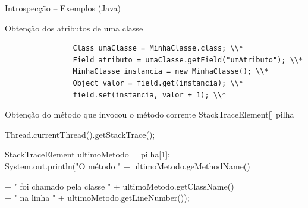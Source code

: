 \documentclass[12pt,t]{beamer}
\begin{document}
 	 \begin{frame}{Introspecção -- Exemplos (Java)}
 	 	\begin{exampleblock}{Obtenção dos atributos de uma classe}
 	 		\begin{lstlisting}
	 	 		Class umaClasse = MinhaClasse.class; \\*
				Field atributo = umaClasse.getField("umAtributo"); \\*
				MinhaClasse instancia = new MinhaClasse(); \\*
				Object valor = field.get(instancia); \\*
				field.set(instancia, valor + 1); \\*
			\end{lstlisting}
 	 	\end{exampleblock}
 	 	\begin{exampleblock}{Obtenção do método que invocou o método corrente}
 	 		StackTraceElement[] pilha = \\
 	 		\begin{adjustwidth}{2.5em}{0pt}
 	 			Thread.currentThread().getStackTrace(); \\
			\end{adjustwidth}
 	 		StackTraceElement ultimoMetodo = pilha[1]; \\
 	 		System.out.println("O método " + ultimoMetodo.geMethodName()\\
 	 		\begin{adjustwidth}{2.5em}{0pt}
		    	 + " foi chamado pela classe " + ultimoMetodo.getClassName()\\
				 + " na linha " + ultimoMetodo.getLineNumber()); \\
		    \end{adjustwidth}
 	 	\end{exampleblock}
 	 \end{frame}
\end{document}
